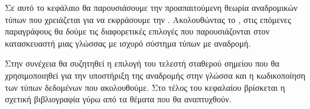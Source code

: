 Σε αυτό το κεφάλαιο θα παρουσιάσουμε την προαπαιτούμενη θεωρία αναδρομικών
τύπων που χρειάζεται για να εκφράσουμε την \FOMF. Ακολουθώντας το \cite{tapl}, στις
επόμενες παραγράφους θα δούμε τις διαφορετικές επιλογές που παρουσιάζονται στον
κατασκευαστή μιας γλώσσας με ισχυρό σύστημα τύπων με αναδρομή.

Στην συνέχεια θα συζητηθεί η επιλογή του τελεστή σταθερού σημείου που θα χρησιμοποιηθεί
για την υποστήριξη της αναδρομής στην γλώσσα και η κωδικοποίηση των τύπων δεδομένων
που ακολουθούμε. Στο τέλος του κεφαλαίου βρίσκεται η σχετική βιβλιογραφία γύρω από τα
θέματα που θα αναπτυχθούν.
